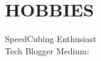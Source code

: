 \documentclass[]{deedy-resume-openfont}
\begin{document}
\begin{minipage}[t]{0.30\textwidth}

\section{HOBBIES}
\textbullet{} SpeedCubing Enthusiast  \\
\textbullet{} Tech Blogger Medium:  \href{https://medium.com/@anshul.ahu/}{} \\
\sectionsep




%
%

\end{minipage} 
\hfill
\end{document}
